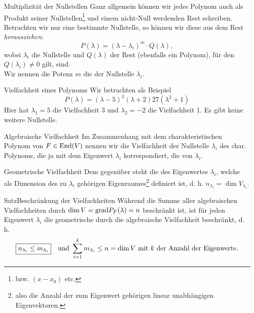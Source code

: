\begin{Def}
{Multiplizität der Nullstellen}
Ganz allgemein können wir jedes Polynom auch als Produkt seiner Nullstellen\footnote{bzw. $(x-x_0)$ etc.} und einem nicht-Null werdenden Rest schreiben.\\
Betrachten wir nur eine bestimmte Nullstelle, so können wir diese aus dem Rest \textit{herausziehen}:
\begin{equation*}
P(\lambda)=(\lambda-\lambda_i)^m\cdot Q(\lambda),
\end{equation*}
wobei $\lambda_i$ die Nullstelle und $Q(\lambda)$ der Rest (ebenfalls ein Polynom), für den $Q(\lambda_i)\neq 0$ gilt, sind.\\
Wir nennen die Potenz $m$ die  der Nullstelle $\lambda_i$.
\end{Def}

\begin{Beispiel}{Vielfachheit eines Polynoms}
Wir betrachten als Beispiel
\begin{equation*}
P(\lambda)=(\lambda-5)^3(\lambda+2)27(\lambda^2+1)
\end{equation*}
Hier hat $\lambda_1=5$ die Vielfachheit 3 und $\lambda_2=-2$ die Vielfachheit 1. Es gibt keine weitere Nullstelle.
\end{Beispiel}

\begin{Def}
{Algebraische Vielfachheit}
Im Zusammenhang mit dem charakteristischen Polynom von $F\in\text{End}(V)$ nennen wir die Vielfachheit der Nullstelle $\lambda_i$ des char. Polynoms, die ja mit dem Eigenwert $\lambda_i$ korrespondiert, die  von $\lambda_i$.
\end{Def}

\begin{Def}
{Geometrische Vielfachheit}
Dem gegenüber steht die  des Eigenwertes $\lambda_i$, welche als Dimension des zu $\lambda_i$ gehörigen Eigenraumes\footnote{also die Anzahl der zum Eigenwert gehörigen linear unabhängigen Eigenvektoren.} definiert ist, d. h. $n_{\lambda_i}=\dim V_{\lambda_i}$.
\end{Def}

\begin{Satz}{Satz}{Beschränkung der Vielfachheiten}
Während die Summe aller algebraischen Vielfachheiten durch $\dim V=\text{grad} P_F(\lambda)=n$ beschränkt ist, ist für jeden Eigenwert $\lambda_i$ die geometrische durch die algebraische Vielfachheit beschränkt, d. h.
\begin{equation}
\boxed{n_{\lambda_i}\leq m_{\lambda_i}}\quad \text{und }\sum_{i=1}^km_{\lambda_i}\leq n=\dim V\text{ mit $k$ der Anzahl der Eigenwerte.}
\end{equation}
\end{Satz}

